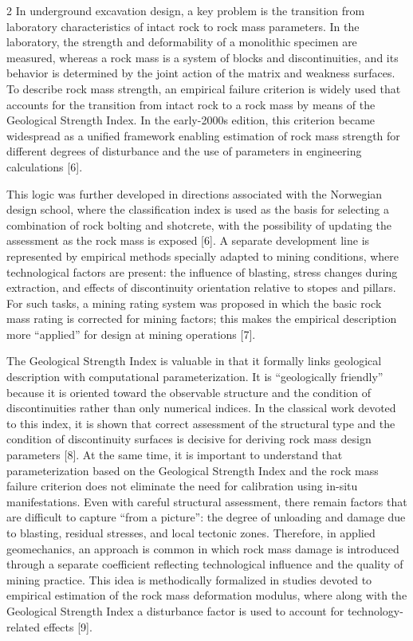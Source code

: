 \begin{multicols}{2}
In underground excavation design, a key problem is the transition from
laboratory characteristics of intact rock to rock mass parameters. In
the laboratory, the strength and deformability of a monolithic specimen
are measured, whereas a rock mass is a system of blocks and
discontinuities, and its behavior is determined by the joint action of
the matrix and weakness surfaces. To describe rock mass strength, an
empirical failure criterion is widely used that accounts for the
transition from intact rock to a rock mass by means of the Geological
Strength Index. In the early-2000s edition, this criterion became
widespread as a unified framework enabling estimation of rock mass
strength for different degrees of disturbance and the use of parameters
in engineering calculations {[}6{]}.

This logic was further developed in directions associated with the
Norwegian design school, where the classification index is used as the
basis for selecting a combination of rock bolting and shotcrete, with
the possibility of updating the assessment as the rock mass is exposed
{[}6{]}. A separate development line is represented by empirical methods
specially adapted to mining conditions, where technological factors are
present: the influence of blasting, stress changes during extraction,
and effects of discontinuity orientation relative to stopes and pillars.
For such tasks, a mining rating system was proposed in which the basic
rock mass rating is corrected for mining factors; this makes the
empirical description more ``applied'' for design at mining operations
{[}7{]}.

The Geological Strength Index is valuable in that it formally links
geological description with computational parameterization. It is
``geologically friendly'' because it is oriented toward the observable
structure and the condition of discontinuities rather than only
numerical indices. In the classical work devoted to this index, it is
shown that correct assessment of the structural type and the condition
of discontinuity surfaces is decisive for deriving rock mass design
parameters {[}8{]}. At the same time, it is important to understand that
parameterization based on the Geological Strength Index and the rock
mass failure criterion does not eliminate the need for calibration using
in-situ manifestations. Even with careful structural assessment, there
remain factors that are difficult to capture ``from a picture'': the
degree of unloading and damage due to blasting, residual stresses, and
local tectonic zones. Therefore, in applied geomechanics, an approach is
common in which rock mass damage is introduced through a separate
coefficient reflecting technological influence and the quality of mining
practice. This idea is methodically formalized in studies devoted to
empirical estimation of the rock mass deformation modulus, where along
with the Geological Strength Index a disturbance factor is used to
account for technology-related effects {[}9{]}.


\end{multicols}
